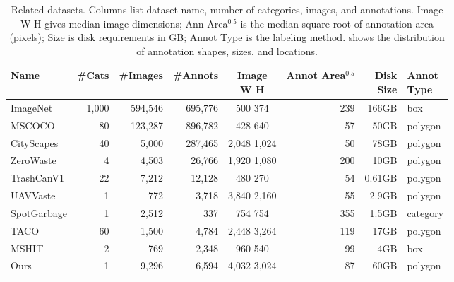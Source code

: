 \begin{table*}[t]
\caption{Related datasets.
%
Columns list dataset name, number of categories, images, and annotations.
Image W \times{} H gives median image dimensions;
Ann Area$^{0.5}$ is the median square root of annotation area (pixels);
Size is disk requirements in GB; 
Annot Type is the labeling method.
 shows the distribution of annotation shapes, sizes, and locations.
}
\label{tab:related_datasets}
\begin{tabular}{lrrrcrrl}
\toprule
Name & \#Cats & \#Images & \#Annots & \makecell{Image\\W \times{} H} & \makecell{Annot\\Area$^{0.5}$} & \makecell{Disk\\Size} & \makecell{Annot\\Type} \\
\midrule
ImageNet\cite{ILSVRC15}    & 1,000 & 594,546 & 695,776 & 500 \times{} 374 & 239 & 166GB & box \\
MSCOCO\cite{lin_microsoft_2014}      & 80 & 123,287 & 896,782 & 428 \times{} 640 & 57 & 50GB & polygon \\
CityScapes\cite{cordts2015cityscapes}  & 40 & 5,000 & 287,465 & 2,048 \times{} 1,024 & 50 & 78GB & polygon \\
ZeroWaste \cite{bashkirova_zerowaste_2022}   & 4 & 4,503 & 26,766 & 1,920 \times{} 1,080 & 200 & 10GB & polygon \\
TrashCanV1\cite{hong2020trashcansemanticallysegmenteddatasetvisual}  & 22 & 7,212 & 12,128 & 480 \times{} 270 & 54 & 0.61GB & polygon \\
UAVVaste\cite{rs13050965}    & 1 & 772 & 3,718 & 3,840 \times{} 2,160 & 55 & 2.9GB & polygon \\
SpotGarbage\cite{mittal2016spotgarbage} & 1 & 2,512 & 337 & 754 \times{} 754 & 355 & 1.5GB & category \\
TACO\cite{proenca_taco_2020}        & 60 & 1,500 & 4,784 & 2,448 \times{} 3,264 & 119 & 17GB & polygon \\
MSHIT\cite{mshit_2020}       & 2 & 769 & 2,348 & 960 \times{} 540 & 99 & 4GB & box \\
Ours        & 1 & 9,296 & 6,594 & 4,032 \times{} 3,024 & 87 & 60GB & polygon \\
\bottomrule
\end{tabular}
\end{table*}

